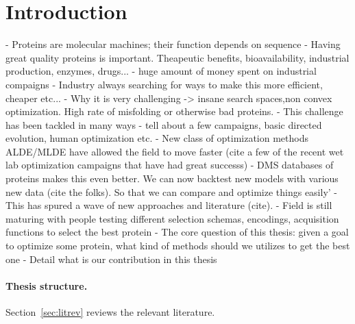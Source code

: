 \section{Introduction}
- Proteins are molecular machines; their function depends on sequence
- Having great quality proteins is important. Theapeutic benefits, bioavailability, industrial production, enzymes, drugs...
- huge amount of money spent on industrial compaigns
- Industry always searching for ways to make this more efficient, cheaper etc... 
- Why it is very challenging -> insane search spaces,non convex optimization. High rate of misfolding or otherwise bad proteins. 
- This challenge has been tackled in many ways
  - tell about a few campaigns, basic directed evolution, human optimization etc.
  - New class of optimization methods ALDE/MLDE have allowed the field to move faster (cite a few of the recent wet lab optimization campaigns that have had great successs)
  - DMS databases of proteins makes this even better. We can now backtest new models with various new data (cite the folks). So that we can compare and optimize things easily'
  - This has spured a wave of new approaches and literature (cite). 
  - Field is still maturing with people testing different selection schemas, encodings, acquisition functions to select the best protein
- The core question of this thesis: given a goal to optimize some protein, what kind of methods should we utilizes to get the best one
- Detail what is our contribution in this thesis 
\paragraph{Thesis structure.}
Section~\ref{sec:litrev} reviews the relevant literature.